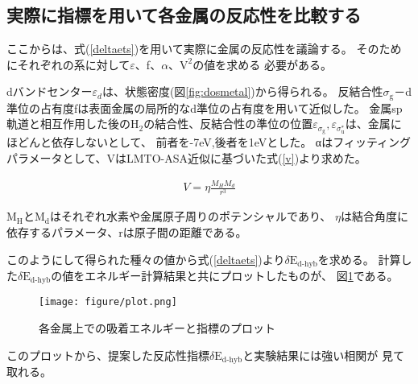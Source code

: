 \documentclass[12pt]{ltjsarticle}
\begin{document}
\subsection{実際に指標を用いて各金属の反応性を比較する}
ここからは、式(\ref{deltaets})を用いて実際に金属の反応性を議論する。
そのためにそれぞれの系に対して$\varepsilon$、f、$\alpha$、$\text{V}^\text{2}$の値を求める
必要がある。

dバンドセンター$\varepsilon_d$は、状態密度(図\ref{fig:dosmetal})から得られる。
反結合性$\sigma_\text{g}$－d準位の占有度fは表面金属の局所的なd準位の占有度を用いて近似した。
金属sp軌道と相互作用した後の$\text{H}_\text{2}$の結合性、反結合性の準位の位置$\varepsilon _
{\sigma_\text{g}},\varepsilon _{\sigma_\text{u}^*}$は、金属にほどんと依存しないとして、
前者を-7eV,後者を1eVとした。
αはフィッティングパラメータとして、VはLMTO-ASA近似に基づいた式(\ref{v})より求めた。
\cite{Norskov1989}

\begin{eqnarray}
    \label{v}
    V = \eta \frac{ M_H M_d }{r^3}
\end{eqnarray}

$\text{M}_\text{H}$と$\text{M}_\text{d}$はそれぞれ水素や金属原子周りのポテンシャルであり、
$\eta$は結合角度に依存するパラメータ、rは原子間の距離である。

このようにして得られた種々の値から式(\ref{deltaets})より$\delta \text{E}_\text{d-hyb}$を求める。
計算した$\delta \text{E}_\text{d-hyb}$の値をエネルギー計算結果と共にプロットしたものが、
図\ref{fig:plot}である。

\begin{figure}[hbtp]
    \begin{center}
     \texttt{[image: figure/plot.png]}
    \end{center}
    \caption{各金属上での吸着エネルギーと指標のプロット}
    \label{fig:plot}
\end{figure}
このプロットから、提案した反応性指標$\delta \text{E}_\text{d-hyb}$と実験結果には強い相関が
見て取れる。
\end{document}
